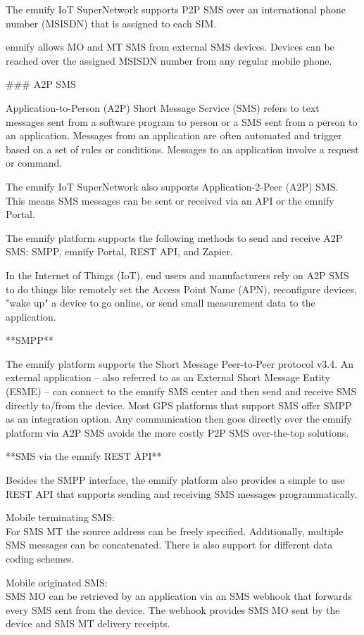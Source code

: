 \documentclass[11pt, oneside]{article}   	%
\begin{document}
\begin{markdown}
The emnify IoT SuperNetwork supports P2P SMS over an international phone number (MSISDN) that is assigned to each SIM.

emnify allows MO and MT SMS from external SMS devices.
Devices can be reached over the assigned MSISDN number from any regular mobile phone.

### A2P SMS

Application-to-Person (A2P) Short Message Service (SMS) refers to text messages sent from a software program to person or a SMS sent from a person to an application. Messages from an application are often automated and trigger based on a set of rules or conditions.
Messages to an application involve a request or command.

The emnify IoT SuperNetwork also supports Application-2-Peer (A2P) SMS.
This means SMS messages can be sent or received via an API or the emnify Portal.

The emnify platform supports the following methods to send and receive A2P SMS: SMPP, emnify Portal, REST API, and Zapier.

In the Internet of Things (IoT), end users and manufacturers rely on A2P SMS to do things like remotely set the Access Point Name (APN), reconfigure devices, "wake up" a device to go online, or send small measurement data to the application.

**SMPP**

The emnify platform supports the Short Message Peer-to-Peer protocol v3.4.
An external application -- also referred to as an External Short Message Entity (ESME) -- can connect to the emnify SMS center and then send and receive SMS directly to/from the device.
Most GPS platforms that support SMS offer SMPP as an integration option.
Any communication then goes directly over the emnify platform via A2P SMS avoids the more costly P2P SMS over-the-top solutions.

**SMS via the emnify REST API**

Besides the SMPP interface, the emnify platform also provides a simple to use REST API that supports sending and receiving SMS messages programmatically. 

\end{markdown}

Mobile terminating SMS: \\
For SMS MT the source address can be freely specified.
Additionally, multiple SMS messages can be concatenated.
There is also support for different data coding schemes.

Mobile originated SMS: \\
SMS MO can be retrieved by an application via an SMS webhook that forwards every SMS sent from the device.
The webhook provides SMS MO sent by the device and SMS MT delivery receipts.
\end{document}
